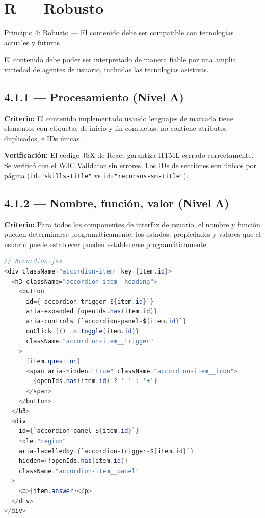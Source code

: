 \documentclass[12pt, a4paper]{article}
\begin{document}
\section{R --- Robusto}

\begin{princbox}[errored]{Principio 4: Robusto --- El contenido debe ser compatible con tecnologías actuales y futuras}

El contenido debe poder ser interpretado de manera fiable por una amplia variedad de agentes de usuario, incluidas las tecnologías asistivas.
\end{princbox}

\subsection{4.1.1 --- Procesamiento (Nivel A)}

\textbf{Criterio:} El contenido implementado usando lenguajes de marcado tiene elementos con etiquetas de inicio y fin completas, no contiene atributos duplicados, e IDs únicas.

\textbf{Verificación:} El código JSX de React garantiza HTML cerrado correctamente. Se verificó con el W3C Validator sin errores. Los IDs de secciones son únicos por página (\texttt{id="skills-title"} vs \texttt{id="recursos-sm-title"}).

\subsection{4.1.2 --- Nombre, función, valor (Nivel A)}

\textbf{Criterio:} Para todos los componentes de interfaz de usuario, el nombre y función pueden determinarse programáticamente; los estados, propiedades y valores que el usuario puede establecer pueden establecerse programáticamente.

\begin{evidbox}
\begin{lstlisting}[language=Java]
// Accordion.jsx
<div className="accordion-item" key={item.id}>
  <h3 className="accordion-item__heading">
    <button
      id={`accordion-trigger-${item.id}`}
      aria-expanded={openIds.has(item.id)}
      aria-controls={`accordion-panel-${item.id}`}
      onClick={() => toggle(item.id)}
      className="accordion-item__trigger"
    >
      {item.question}
      <span aria-hidden="true" className="accordion-item__icon">
        {openIds.has(item.id) ? '-' : '+'}
      </span>
    </button>
  </h3>
  <div
    id={`accordion-panel-${item.id}`}
    role="region"
    aria-labelledby={`accordion-trigger-${item.id}`}
    hidden={!openIds.has(item.id)}
    className="accordion-item__panel"
  >
    <p>{item.answer}</p>
  </div>
</div>
\end{lstlisting}
\end{evidbox}
\end{document}

